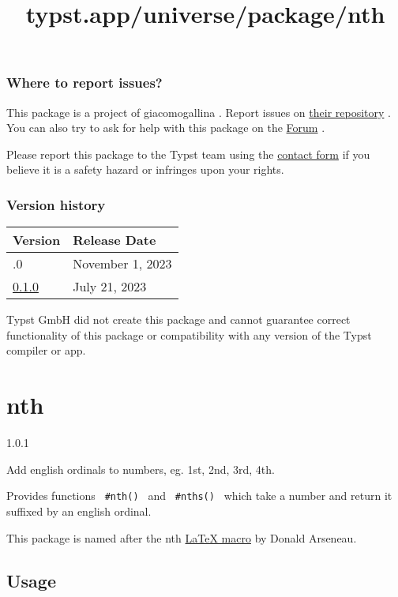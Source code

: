 \subsubsection{Where to report issues?}\label{where-to-report-issues}

This package is a project of giacomogallina . Report issues on
\href{https://gitlab.com/giacomogallina/commute}{their repository} . You
can also try to ask for help with this package on the
\href{https://forum.typst.app}{Forum} .

Please report this package to the Typst team using the
\href{https://typst.app/contact}{contact form} if you believe it is a
safety hazard or infringes upon your rights.

\label{versions}
\subsubsection{Version history}\label{version-history}

\begin{longtable}[]{@{}ll@{}}
\toprule\noalign{}
Version & Release Date \\
\midrule\noalign{}
\endhead
\bottomrule\noalign{}
\endlastfoot
0.2.0 & November 1, 2023 \\
\href{https://typst.app/universe/package/commute/0.1.0/}{0.1.0} & July
21, 2023 \\
\end{longtable}

Typst GmbH did not create this package and cannot guarantee correct
functionality of this package or compatibility with any version of the
Typst compiler or app.


\title{typst.app/universe/package/nth}

\label{banner}
\section{nth}\label{nth}

{ 1.0.1 }

Add english ordinals to numbers, eg. 1st, 2nd, 3rd, 4th.

\label{readme}
Provides functions \texttt{\ \#nth()\ } and \texttt{\ \#nths()\ } which
take a number and return it suffixed by an english ordinal.

This package is named after the nth
\href{https://ctan.org/pkg/nth}{LaTeX macro} by Donald Arseneau.

\subsection{Usage}\label{usage}

